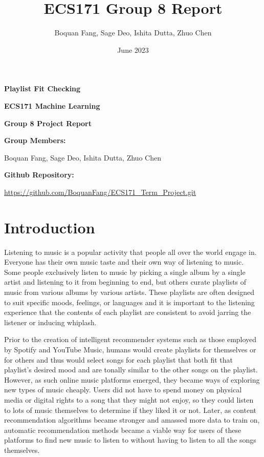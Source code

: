 \documentclass[titlepage]{article}
\title{ECS171 Group 8 Report}
\author{Boquan Fang, Sage Deo, Ishita Dutta, Zhuo Chen}
\date{June 2023}
\begin{document}
\begin{titlepage}
    \begin{center}
        \vspace*{6cm}

        \Huge
        \textbf{Playlist Fit Checking}

        \vspace{0.5cm}

        \LARGE
        \textbf{ECS171 Machine Learning}

        \textbf{Group 8 Project Report}

        \vspace{0.5cm}

        \Large
        \textbf{Group Members:}

        Boquan Fang, Sage Deo, Ishita Dutta, Zhuo Chen

        \vspace{0.5cm}

        \textbf{Github Repository:}

        \url{https://github.com/BoquanFang/ECS171_Term_Project.git}

        \vspace*{\fill}
    \end{center}
\end{titlepage}




\section{Introduction}
Listening to music is a popular activity that people all over the world engage in. 
Everyone has their own music taste and their own way of listening to music.
Some people exclusively listen to music by picking a single album by a single artist 
and listening to it from beginning to end, but others curate playlists of music from
various albums by various artists. These playlists are often designed to suit specific
moods, feelings, or languages and it is important to the listening experience that the contents of
each playlist are consistent to avoid jarring the listener or inducing whiplash.

Prior to the creation of intelligent recommender systems such as those employed by 
Spotify and YouTube Music, humans would create playlists for themselves or for others
and thus would select songs for each playlist that both fit that playlist's desired mood
and are tonally similar to the other songs on the playlist. However, as such 
online music platforms emerged, they became ways of exploring new types of music cheaply.
Users did not have to spend money on physical media or digital rights to a song that they
might not enjoy, so they could listen to lots of music themselves to determine if they liked it
or not. Later, as content recommendation algorithms became stronger and amassed more data
to train on, automatic recommendation methods became a viable way for users of these platforms
to find new music to listen to without having to listen to all the songs themselves. 
\end{document}
